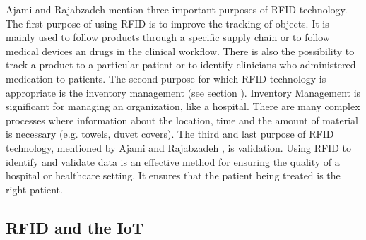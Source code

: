 Ajami and Rajabzadeh \cite{ncbi} mention three important purposes of RFID technology. The first purpose of using RFID is to improve the tracking of objects. It is mainly used to follow products through a specific supply chain or to follow medical devices an drugs in the clinical workflow. There is also the possibility to track a product to a particular patient or to identify clinicians who administered medication to patients.
The second purpose for which RFID technology is appropriate is the inventory management (see section \pageref{inventory}). Inventory Management is significant for managing an organization, like a hospital. There are many complex processes where information about the location, time and the amount of material is necessary (e.g. towels, duvet covers).
The third and last purpose of RFID technology, mentioned by Ajami and Rajabzadeh \cite{ncbi}, is validation. Using RFID to identify and validate data is an effective method for ensuring the quality of a hospital or healthcare setting. It ensures that the patient being treated is the right patient.

\subsection{RFID and the IoT}

